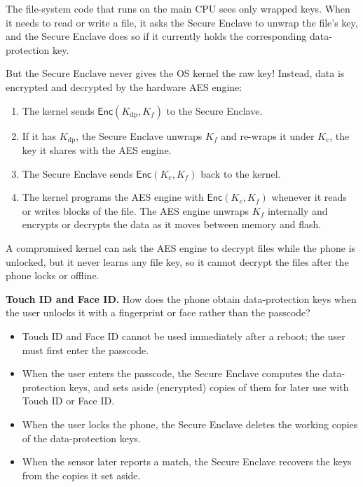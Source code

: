 \documentclass[
  letterpaper,
]{scrbook}
\providecommand{\tightlist}{%
  \setlength{\itemsep}{0pt}\setlength{\parskip}{0pt}}
\theoremstyle{definition}
\theoremstyle{plain}
\theoremstyle{plain}
\theoremstyle{remark}
\begin{document}
The file-system code that runs on the main CPU sees only wrapped keys.
When it needs to read or write a file, it asks the Secure Enclave to
unwrap the file's key, and the Secure Enclave does so if it currently
holds the corresponding data-protection key.

But the Secure Enclave never gives the OS kernel the raw key! Instead,
data is encrypted and decrypted by the hardware AES engine:

\begin{enumerate}
\def\labelenumi{\arabic{enumi}.}
\tightlist
\item
  The kernel sends \(\mathsf{Enc}(K_\text{dp}, K_f)\) to the Secure
  Enclave.
\item
  If it has \(K_\text{dp}\), the Secure Enclave unwraps \(K_f\) and
  re-wraps it under \(K_e\), the key it shares with the AES engine.
\item
  The Secure Enclave sends \(\mathsf{Enc}(K_e, K_f)\) back to the
  kernel.
\item
  The kernel programs the AES engine with \(\mathsf{Enc}(K_e, K_f)\)
  whenever it reads or writes blocks of the file. The AES engine unwraps
  \(K_f\) internally and encrypts or decrypts the data as it moves
  between memory and flash.
\end{enumerate}


A compromised kernel can ask the AES engine to decrypt files while the
phone is unlocked, but it never learns any file key, so it cannot
decrypt the files after the phone locks or offline.

\textbf{Touch ID and Face ID.} How does the phone obtain data-protection
keys when the user unlocks it with a fingerprint or face rather than the
passcode?

\begin{itemize}
\tightlist
\item
  Touch ID and Face ID cannot be used immediately after a reboot; the
  user must first enter the passcode.
\item
  When the user enters the passcode, the Secure Enclave computes the
  data-protection keys, and sets aside (encrypted) copies of them for
  later use with Touch ID or Face ID.
\item
  When the user locks the phone, the Secure Enclave deletes the working
  copies of the data-protection keys.
\item
  When the sensor later reports a match, the Secure Enclave recovers the
  keys from the copies it set aside.
\end{itemize}
\end{document}
